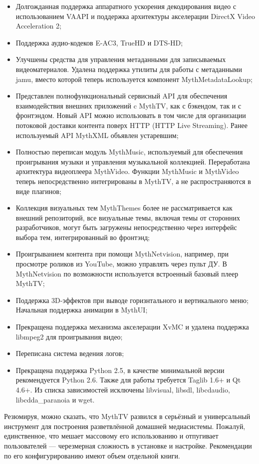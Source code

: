 \documentclass[10pt, a5paper]{article}
\begin{document}
\begin{itemize}
  \item Долгожданная поддержка аппаратного ускорения декодирования видео с использованием VAAPI и поддержка архитектуры акселерации DirectX Video Acceleration 2;
  \item Поддержка аудио-кодеков E-AC3, TrueHD и DTS-HD;
  \item Улучшены средства для управления метаданными для записываемых видеоматериалов. Удалена поддержка утилиты для работы с метаданными jamu, вместо которой теперь используется компонент MythMetadataLookup;
  \item Представлен полнофункциональный сервисный API для обеспечения взаимодействия внешних приложений c MythTV, как с бэкендом, так и с фронтэндом. Новый API можно использовать в том числе для организации потоковой доставки контента поверх HTTP (HTTP Live Streaming). Ранее используемый API MythXML объявлен устаревшим;
  \item Полностью переписан модуль MythMusic, используемый для обеспечения проигрывания музыки и управления музыкальной коллекцией. Переработана архитектура видеоплеера \linebreak MythVideo. Функции MythMusic и MythVideo теперь непосредственно интегрированы в MythTV, а не распространяются в виде плагинов;
  \item Коллекция визуальных тем MythThemes более не рассматривается как внешний репозиторий, все визуальные темы, включая темы от сторонних разработчиков,  могут быть загружены непосредственно через интерфейс выбора тем, интегрированный во фронтэнд;
  \item Проигрыванием контента при помощи MythNetvision, например, при просмотре роликов из YouTube, можно управлять через пульт ДУ. В MythNetvision по возможности используется встроенный базовый плеер MythTV;
  \item Поддержка 3D-эффектов при выводе горизнтального и вертикального меню; 
Начальная поддержка анимации в MythUI;
  \item Прекращена поддержка механизма акселерации XvMC и удалена поддержка libmpeg2 для проигрывания видео;
  \item Переписана система ведения логов;
  \item Прекращена поддержка Python 2.5, в качестве минимальной версии рекомендуется Python 2.6. Также для работы требуется Taglib 1.6+ и Qt 4.6+. Из списка зависимостей исключены libvisual, libsdl, libcdaudio, libcdda\_paranoia и wget.
\end{itemize}

Резюмируя, можно сказать, что MythTV развился в серьёзный и универсальный инструмент для построения разветвлённой домашней медиасистемы. Пожалуй,  единственное, что мешает массовому его использованию и отпугивает пользователей --- черезмерная  сложность в установке и настройке. Рекомендации по его конфигурированию имеют объем отдельной книги.
\end{document}
